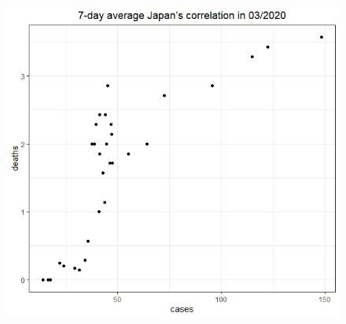 \documentclass[a4paper]{article}
\theoremstyle{definition}
\begin{document}
\begin{enumerate}[1)]
\begin{figure}[H]
\begin{center}
        \includegraphics[scale = 0.3]{ix/ix.3/JPN_03_2020.png}
        

\end{center}
\end{figure}
\end{enumerate}
\end{document}

